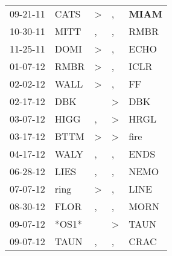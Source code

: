 \begin{supertabular}{p{0.07\textwidth}p{0.06\textwidth}p{0.02\textwidth}p{0.02\textwidth}p{0.06\textwidth}}
          09-21-11\textsuperscript{} &           CATS\textsuperscript{} &     \textgreater &                , &  \textbf{MIAM\textsuperscript{}} \\
          10-30-11\textsuperscript{} &           MITT\textsuperscript{} &                , &                , &           RMBR\textsuperscript{} \\
          11-25-11\textsuperscript{} &           DOMI\textsuperscript{} &     \textgreater &                , &           ECHO\textsuperscript{} \\
          01-07-12\textsuperscript{} &           RMBR\textsuperscript{} &     \textgreater &                , &           ICLR\textsuperscript{} \\
          02-02-12\textsuperscript{} &           WALL\textsuperscript{} &     \textgreater &                , &             FF\textsuperscript{} \\
          02-17-12\textsuperscript{} &            DBK\textsuperscript{} &                  &     \textgreater &            DBK\textsuperscript{} \\
          03-07-12\textsuperscript{} &           HIGG\textsuperscript{} &                , &     \textgreater &           HRGL\textsuperscript{} \\
          03-17-12\textsuperscript{} &           BTTM\textsuperscript{} &     \textgreater &     \textgreater &           fire\textsuperscript{} \\
          04-17-12\textsuperscript{} &           WALY\textsuperscript{} &                , &                , &           ENDS\textsuperscript{} \\
          06-28-12\textsuperscript{} &           LIES\textsuperscript{} &                , &                , &           NEMO\textsuperscript{} \\
          07-07-12\textsuperscript{} &           ring\textsuperscript{} &     \textgreater &                , &           LINE\textsuperscript{} \\
          08-30-12\textsuperscript{} &           FLOR\textsuperscript{} &                , &                , &           MORN\textsuperscript{} \\
          09-07-12\textsuperscript{} &                            *OS1* &                  &     \textgreater &           TAUN\textsuperscript{} \\
          09-07-12\textsuperscript{} &           TAUN\textsuperscript{} &                , &                , &           CRAC\textsuperscript{} \\

\end{supertabular}
